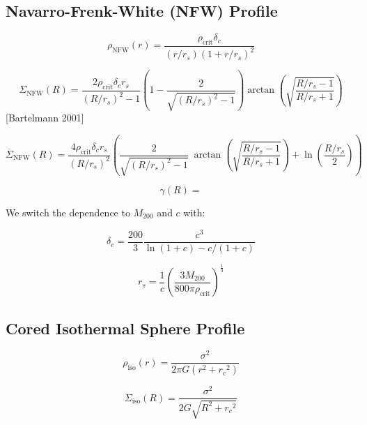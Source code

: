 \documentclass[]{article}
\begin{document}
\newpage

\subsection{Navarro-Frenk-White (NFW) Profile}

\begin{equation}
    \rho_\mathrm{NFW}(r) = \frac{\rho_\mathrm{crit} \delta_c}{(r/r_s)\left(1 + r/r_s\right)^2}
\end{equation}

\begin{equation}
    \Sigma_\mathrm{NFW}(R) = \frac{2 \rho_\mathrm{crit} \delta_c r_s}{(R/r_s)^2 - 1} \left(1 - \frac{2}{\sqrt{(R/r_s)^2 - 1}} \right) \arctan\left(\sqrt{\frac{R/r_s - 1}{R/r_s + 1}} \right)
\end{equation}
[Bartelmann 2001]

\begin{equation}
    \overline{\Sigma}_\mathrm{NFW}(R) = \frac{4 \rho_\mathrm{crit} \delta_c r_s}{(R/r_s)^2} \left(
        \frac{2}{\sqrt{(R/r_s)^2 - 1}} ~\arctan\left(\sqrt{\frac{R/r_s - 1}{R/r_s + 1}} \right) + \ln{\left(\frac{R/r_s}{2}\right)}
    \right)
\end{equation}

\begin{equation}
    \gamma(R) =
\end{equation}

We switch the dependence to $M_{200}$ and $c$ with:

\begin{equation}
    \delta_c = \frac{200}{3} \frac{c^3}{\ln(1 + c) - c/(1 + c)}
\end{equation}

\begin{equation}
    r_s = \frac{1}{c} \left(\frac{3M_{200}}{800\pi \rho_\mathrm{crit}}\right)^\frac{1}{3}
\end{equation}

\subsection{Cored Isothermal Sphere Profile}

\begin{equation}
    \rho_\mathrm{iso}(r) = \frac{\sigma^2}{2\pi G (r^2 + {r_c}^2)}
\end{equation}

\begin{equation}
    \Sigma_\mathrm{iso}(R) = \frac{\sigma^2}{2 G \sqrt{R^2 + {r_c}^2}}
\end{equation}
\end{document}
